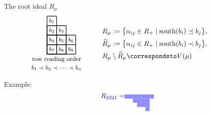 \documentclass[dvipsnames,handout]{beamer}
\newcommand{\south}{{\mathrm{south}}}
\theoremstyle{definition}
\newcommand{\qtrootcolor}{blue!45}
\newcommand{\colorb}[1]{\textcolor{blue}{#1}}
\newcounter{c}
\begin{document}
\begin{frame}{The root ideal \(R_\mu\)}
\begin{align*}
\quad \ \ \
\begin{tikzpicture}[scale = .49]
\begin{scope}
\draw[thick] (0,0) grid (1,4);
\draw[thick] (0,0) grid (2,3);
\draw[thick] (0,0) grid (3,2);
\node at (0.5, 3.5) { \footnotesize $b_1$};
\node at (0.5, 2.5) { \footnotesize $b_2$};
\node at (1.5, 2.5) { \footnotesize $b_3$};
\node at (0.5, 1.5) { \footnotesize $b_4$};
\node at (1.5, 1.5) { \footnotesize $b_5$};
\node at (2.5, 1.5) { \footnotesize $b_6$};
\node at (0.5, 0.5) { \footnotesize $b_7$};
\node at (1.5, 0.5) { \footnotesize $b_8$};
\node at (2.5, 0.5) { \footnotesize $b_9$};
\node at (1,-.54) {\small row reading order };
\node at (1,-1.44) {\small $b_1 \prec b_2 \prec \cdots  \prec b_n$};
\end{scope}
\end{tikzpicture}
\quad  \quad \ \
\raisebox{14mm}{\parbox{7cm}{
$R_\mu  :=  \big\{ \alpha_{ij} \in R_+ \mid  \south(b_i) \preceq b_j
  \big\}$, \\[1.4mm] $\widehat{R}_\mu  :=  \big\{ \alpha_{ij} \in R_+
  \mid  \south(b_i) \prec b_j \big\}$, \\[1.4mm] \(R_\mu \setminus
  \widehat{R}_\mu \correspondsto V(\mu)\) }}
\end{align*}
\vspace{-1cm}
Example:
\begin{align*}
\raisebox{6.7mm}{$\colorb{R_{3321} = }$}
\begin{tikzpicture}[scale=.213]
\draw[draw = none, fill = \qtrootcolor] (2,-1) rectangle (3,-2);
 \draw[draw = none, fill = \qtrootcolor] (3,-1) rectangle (4,-2);
 \draw[draw = none, fill = \qtrootcolor] (4,-1) rectangle (5,-2);
 \draw[draw = none, fill = \qtrootcolor] (4,-2) rectangle (5,-3);
 \draw[draw = none, fill = \qtrootcolor] (5,-1) rectangle (6,-2);
 \draw[draw = none, fill = \qtrootcolor] (5,-2) rectangle (6,-3);
 \draw[draw = none, fill = \qtrootcolor] (5,-3) rectangle (6,-4);
 \draw[draw = none, fill = \qtrootcolor] (6,-1) rectangle (7,-2);
 \draw[draw = none, fill = \qtrootcolor] (6,-2) rectangle (7,-3);
 \draw[draw = none, fill = \qtrootcolor] (6,-3) rectangle (7,-4);
 \draw[draw = none, fill = \qtrootcolor] (7,-1) rectangle (8,-2);
 \draw[draw = none, fill = \qtrootcolor] (7,-2) rectangle (8,-3);
 \draw[draw = none, fill = \qtrootcolor] (7,-3) rectangle (8,-4);
 \draw[draw = none, fill = \qtrootcolor] (7,-4) rectangle (8,-5);
 \draw[draw = none, fill = \qtrootcolor] (8,-1) rectangle (9,-2);

\end{tikzpicture}
\end{align*}
\end{frame}
\end{document}
